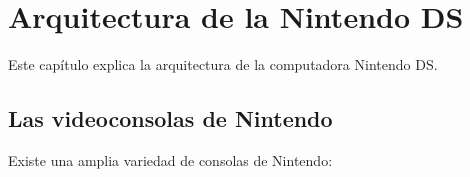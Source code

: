 \chapter{Arquitectura de la Nintendo DS}

Este capítulo explica la arquitectura de la computadora Nintendo DS.

\section{Las videoconsolas de Nintendo}

Existe una amplia variedad de consolas de Nintendo:

